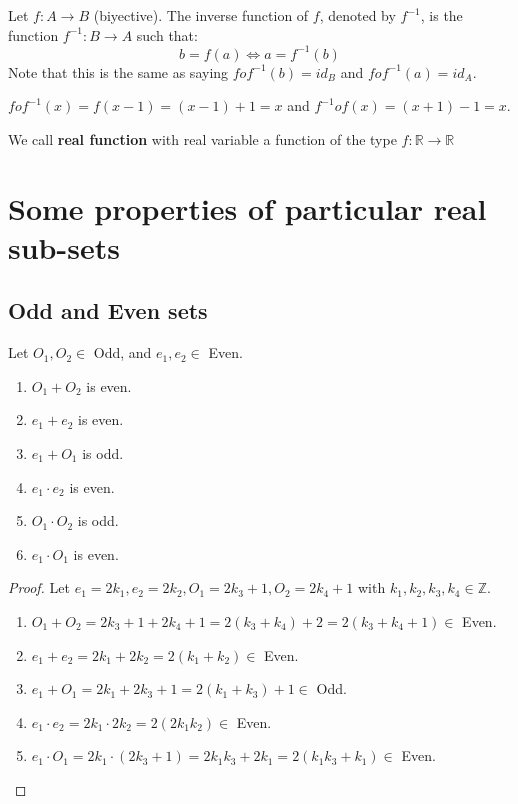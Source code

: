 \documentclass[12pt, a4paper]{book}
\begin{document}
\begin{defn}
  Let $f:A\longrightarrow B$ (biyective). The inverse function of $f$, denoted by $f^{-1}$, is the function $f^{-1}:B \longrightarrow A$ such that:
  \[
    b = f(a) \Leftrightarrow a = f^{-1}(b)
  \]
  Note that this is the same as saying $f o f^{-1}(b) = {id}_B$ and $f o f^{-1}(a) = {id}_A$.
\end{defn}

\begin{exmp}
  $f o f^{-1}(x) = f(x-1) = (x-1)+1 = x$ and $f^{-1} o f(x) = (x+1)-1 = x$.
\end{exmp}

\begin{defn}
  We call \textbf{real function} with real variable a function of the type $f:\mathbb{R} \longrightarrow \mathbb{R}$
\end{defn}

\section{Some properties of particular real sub-sets}

\subsection{Odd and Even sets}

\begin{proposition}
  Let $O_1,O_2 \in$ Odd, and $e_1,e_2 \in$ Even.
  \begin{enumerate}[label=\emph{\alph*})]
    \item $O_1 + O_2$ is even.
    \item $e_1 + e_2$ is even.
    \item $e_1 + O_1$ is odd.
    \item $e_1 \cdot e_2$ is even.
    \item $O_1 \cdot O_2$ is odd.
    \item $e_1 \cdot O_1$ is even.
  \end{enumerate}
\end{proposition}

\begin{proof}
  Let $e_1 = 2 k_1, e_2 = 2 k_2, O_1 = 2 k_3+1, O_2 = 2 k_4+1$ with $k_1, k_2, k_3, k_4 \in\mathbb{Z}$.
  \begin{enumerate}[label=\emph{\alph*})]
    \item $O_1 + O_2 = 2 k_3 +1 +2 k_4 +1 = 2(k_3+k_4) + 2 = 2(k_3+k_4+1) \in$ Even.
    \item $e_1 + e_2 = 2 k_1 + 2 k_2 = 2(k_1+k_2) \in$ Even.
    \item $e_1 + O_1 = 2 k_1 +2 k_3 +1 = 2 (k_1+k_3) +1 \in$ Odd.
    \item $e_1 \cdot e_2 = 2 k_1 \cdot 2 k_2 = 2(2k_1 k_2) \in$ Even.
    \item $e_1 \cdot O_1 = 2 k_1 \cdot (2 k_3 +1) = 2 k_1 k_3 + 2 k_1 = 2 (k_1 k_3 + k_1) \in$ Even.
  \end{enumerate}
\end{proof}
\end{document}

